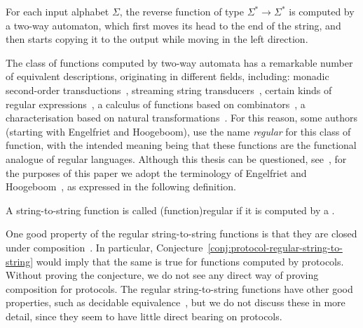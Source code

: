     \begin{myexample}[Reverse]
        For each input alphabet $\Sigma$, the reverse function of type $\Sigma^* \to \Sigma^*$ is computed by a  two-way automaton, which first moves its head to the end of the string, and then starts copying it to the output while moving in the left direction.
    \end{myexample}

    The class of functions computed by two-way automata has a remarkable number
    of equivalent descriptions,  originating in different fields, including:
    monadic second-order transductions~\cite[Section
    4]{engelfrietMSODefinableString2001}, streaming string
    transducers~\cite[Section 3]{alurExpressivenessStreamingString2010},
    certain kinds of regular expressions~\cite[Section 2]{alur2014regular}, a
    calculus of functions based on  combinators~\cite[Theorem
    6.1]{bojanczykRegularFirstOrderList2018}, a characterisation based on
    natural transformations~\cite[Theorem 3.2]{bojanczykTitoRegular23}. For
    this reason, some authors (starting with Engelfriet and Hoogeboom), use the
    name \emph{regular} for this class of function, with the intended meaning
    being that these functions are the functional analogue of regular
    languages. Although this thesis can be questioned,
    see~\cite{polyregular-survey}, for the purposes of this paper we adopt the
    terminology of Engelfriet and
    Hoogeboom~\cite[p.~217]{engelfrietMSODefinableString2001}, as expressed in
    the following definition.


    \begin{definition}
        \label{def:regular-string-to-string}
        A string-to-string function is called \intro(function){regular}
        if it is computed by a .
    \end{definition}
    
    
    One good  property of the regular string-to-string functions is that they
    are closed under composition~\cite[Theorem
    2]{chytilSerialComposition2Way1977}. In particular,
    Conjecture~\ref{conj:protocol-regular-string-to-string} would imply that
    the same is true for functions computed by protocols. Without proving the
    conjecture, we do not see any direct way of proving composition for
    protocols. The  regular string-to-string functions have other good
    properties, such as decidable equivalence~\cite[Theorem
    1]{gurariEquivalenceProblemDeterministic1982}, but we do not discuss these
    in more detail, since they seem to have little direct bearing on protocols.


